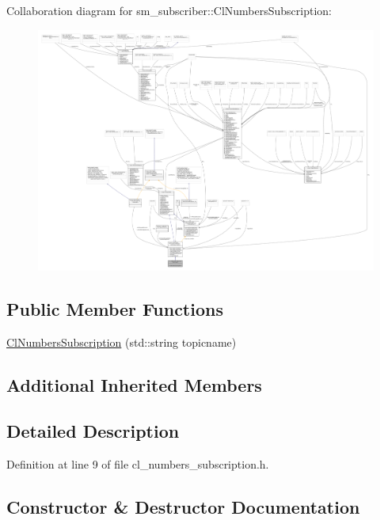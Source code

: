 Collaboration diagram for sm\+\_\+subscriber\+:\+:Cl\+Numbers\+Subscription\+:
\nopagebreak
\begin{figure}[H]
\begin{center}
\leavevmode
\includegraphics[width=350pt]{classsm__subscriber_1_1ClNumbersSubscription__coll__graph}
\end{center}
\end{figure}
\subsection*{Public Member Functions}
\begin{DoxyCompactItemize}
\item 
\hyperlink{classsm__subscriber_1_1ClNumbersSubscription_a3514393e308cc0b61fc92631a9366494}{Cl\+Numbers\+Subscription} (std\+::string topicname)
\end{DoxyCompactItemize}
\subsection*{Additional Inherited Members}


\subsection{Detailed Description}


Definition at line 9 of file cl\+\_\+numbers\+\_\+subscription.\+h.



\subsection{Constructor \& Destructor Documentation}
\mbox{\label{classsm__subscriber_1_1ClNumbersSubscription_a3514393e308cc0b61fc92631a9366494}} 
